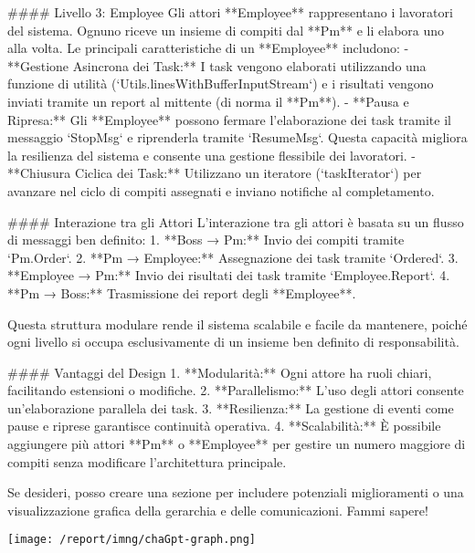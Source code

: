 #### Livello 3: Employee  
Gli attori **Employee** rappresentano i lavoratori del sistema. Ognuno riceve un insieme di compiti dal **Pm** e li elabora uno alla volta. Le principali caratteristiche di un **Employee** includono:
- **Gestione Asincrona dei Task:** I task vengono elaborati utilizzando una funzione di utilità (`Utils.linesWithBufferInputStream`) e i risultati vengono inviati tramite un report al mittente (di norma il **Pm**).
- **Pausa e Ripresa:** Gli **Employee** possono fermare l'elaborazione dei task tramite il messaggio `StopMsg` e riprenderla tramite `ResumeMsg`. Questa capacità migliora la resilienza del sistema e consente una gestione flessibile dei lavoratori.
- **Chiusura Ciclica dei Task:** Utilizzano un iteratore (`taskIterator`) per avanzare nel ciclo di compiti assegnati e inviano notifiche al completamento.

#### Interazione tra gli Attori  
L'interazione tra gli attori è basata su un flusso di messaggi ben definito:
1. **Boss → Pm:** Invio dei compiti tramite `Pm.Order`.
2. **Pm → Employee:** Assegnazione dei task tramite `Ordered`.
3. **Employee → Pm:** Invio dei risultati dei task tramite `Employee.Report`.
4. **Pm → Boss:** Trasmissione dei report degli **Employee**.

Questa struttura modulare rende il sistema scalabile e facile da mantenere, poiché ogni livello si occupa esclusivamente di un insieme ben definito di responsabilità.

#### Vantaggi del Design
1. **Modularità:** Ogni attore ha ruoli chiari, facilitando estensioni o modifiche.
2. **Parallelismo:** L'uso degli attori consente un'elaborazione parallela dei task.
3. **Resilienza:** La gestione di eventi come pause e riprese garantisce continuità operativa.
4. **Scalabilità:** È possibile aggiungere più attori **Pm** o **Employee** per gestire un numero maggiore di compiti senza modificare l'architettura principale.

Se desideri, posso creare una sezione per includere potenziali miglioramenti o una visualizzazione grafica della gerarchia e delle comunicazioni. Fammi sapere!


\texttt{[image: /report/imng/chaGpt-graph.png]}\\[0.5cm]